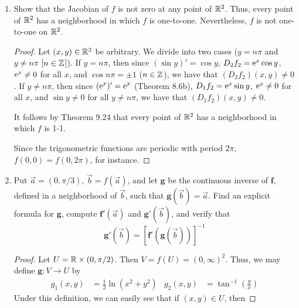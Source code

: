 \documentclass[../psets.tex]{subfiles}
\begin{document}
\begin{enumerate}[label={\textbf{\arabic*.}}]
\begin{enumerate}
\begin{proof}
            The range of $f$ is $\R^2\setminus\{\bm{0}\}$.\par
            Both trigonometric functions have range $[-1,1]$ and $\e[x]$ has range $(0,\infty)$, so we can make $\e[x]$ arbitrarily large and then take $y$ such that such that the trigonometric function equals 1 or $-1$. However, since $\cos y=\pm 1$ when $\sin y=0$ and vice versa, we can never achieve $(0,0)$.
        \end{proof}
        \item Show that the Jacobian of $f$ is not zero at any point of $\R^2$. Thus, every point of $\R^2$ has a neighborhood in which $f$ is one-to-one. Nevertheless, $f$ is not one-to-one on $\R^2$.
        \begin{proof}
            Let $(x,y)\in\R^2$ be arbitrary. We divide into two cases ($y=n\pi$ and $y\neq n\pi$ [$n\in\Z$]). If $y=n\pi$, then since $(\sin y)'=\cos y$, $D_2f_2=\e[x]\cos y$, $\e[x]\neq 0$ for all $x$, and $\cos n\pi=\pm 1$ ($n\in\Z$), we have that $(D_2f_2)(x,y)\neq 0$. If $y\neq n\pi$, then since $(\e[x])'=\e[x]$ (Theorem 8.6b), $D_1f_2=\e[x]\sin y$, $\e[x]\neq 0$ for all $x$, and $\sin y\neq 0$ for all $y\neq n\pi$, we have that $(D_1f_2)(x,y)\neq 0$.\par
            It follows by Theorem 9.24 that every point of $\R^2$ has a neighborhood in which $f$ is 1-1.\par
            Since the trigonometric functions are periodic with period $2\pi$, $f(0,0)=f(0,2\pi)$, for instance.
        \end{proof}
        \item Put $\vec{a}=(0,\pi/3)$, $\vec{b}=f(\vec{a})$, and let $\mathbf{g}$ be the continuous inverse of $\mathbf{f}$, defined in a neighborhood of $\vec{b}$, such that $\mathbf{g}(\vec{b})=\vec{a}$. Find an explicit formula for $\mathbf{g}$, compute $\mathbf{f}'(\vec{a})$ and $\mathbf{g}'(\vec{b})$, and verify that
        \begin{equation*}
            \mathbf{g}'(\vec{b}) = [\mathbf{f}'(\mathbf{g}(\vec{b}))]^{-1}
        \end{equation*}
        \begin{proof}
            Let $U=\R\times(0,\pi/2)$. Then $V=f(U)=(0,\infty)^2$. Thus, we may define $\mathbf{g}:V\to U$ by
            \begin{align*}
                g_1(x,y) &= \frac{1}{2}\ln(x^2+y^2)&
                g_2(x,y) &= \tan^{-1}\left( \frac{y}{x} \right)
            \end{align*}
            Under this definition, we can easily see that if $(x,y)\in U$, then

\end{proof}
\end{enumerate}
\end{enumerate}
\end{document}
